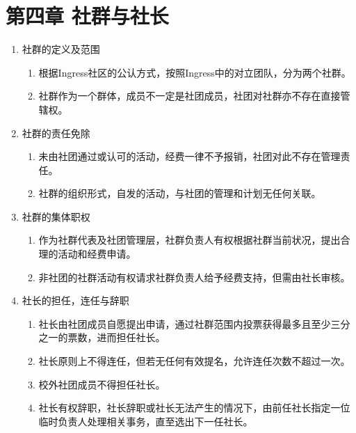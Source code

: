 \documentclass[a4paper]{article}
\newcommand\liststyleWWNumix{%
\renewcommand\theenumi{\arabic{enumi}}
\renewcommand\theenumii{\arabic{enumi}.\arabic{enumii}}
\renewcommand\theenumiii{\arabic{enumi}.\arabic{enumii}.\arabic{enumiii}}
\renewcommand\theenumiv{\arabic{enumi}.\arabic{enumii}.\arabic{enumiii}.\arabic{enumiv}}
\renewcommand\labelenumi{\theenumi.}
\renewcommand\labelenumii{\theenumii.}
\renewcommand\labelenumiii{\theenumiii.}
\renewcommand\labelenumiv{\theenumiv.}
}
\begin{document}
\bigskip

\section[第四章 社群与社长]{第四章 社群与社长}
\liststyleWWNumix
\begin{enumerate}
\item 社群的定义及范围

\begin{enumerate}
\item 根据Ingress社区的公认方式，按照Ingress中的对立团队，分为两个社群。
\item 社群作为一个群体，成员不一定是社团成员，社团对社群亦不存在直接管辖权。
\end{enumerate}
\item 社群的责任免除

\begin{enumerate}
\item 未由社团通过或认可的活动，经费一律不予报销，社团对此不存在管理责任。
\item 社群的组织形式，自发的活动，与社团的管理和计划无任何关联。
\end{enumerate}
\item 社群的集体职权

\begin{enumerate}
\item 作为社群代表及社团管理层，社群负责人有权根据社群当前状况，提出合理的活动和经费申请。
\item 非社团的社群活动有权请求社群负责人给予经费支持，但需由社长审核。
\end{enumerate}
\item 社长的担任，连任与辞职

\begin{enumerate}
\item 社长由社团成员自愿提出申请，通过社群范围内投票获得最多且至少三分之一的票数，进而担任社长。
\item 社长原则上不得连任，但若无任何有效提名，允许连任次数不超过一次。
\item 校外社团成员不得担任社长。
\item 社长有权辞职，社长辞职或社长无法产生的情况下，由前任社长指定一位临时负责人处理相关事务，直至选出下一任社长。
\end{enumerate}
\end{enumerate}

\bigskip
\end{document}
